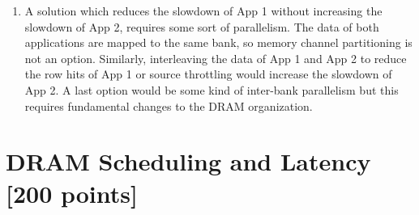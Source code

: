 \documentclass[a4paper]{article}
\begin{document}
\begin{enumerate}[label=\alph*)]
    \item A solution which reduces the slowdown of App 1 without increasing the
        slowdown of App 2, requires some sort of parallelism.  The data of both
        applications are mapped to the same bank, so memory channel partitioning
        is not an option. Similarly, interleaving the data of App 1 and App 2 to
        reduce the row hits of App 1 or source throttling would increase the
        slowdown of App 2. A last option would be some kind of inter-bank
        parallelism but this requires fundamental changes to the DRAM
        organization.
\end{enumerate}

\section{DRAM Scheduling and Latency [200 points]}
\end{document}
